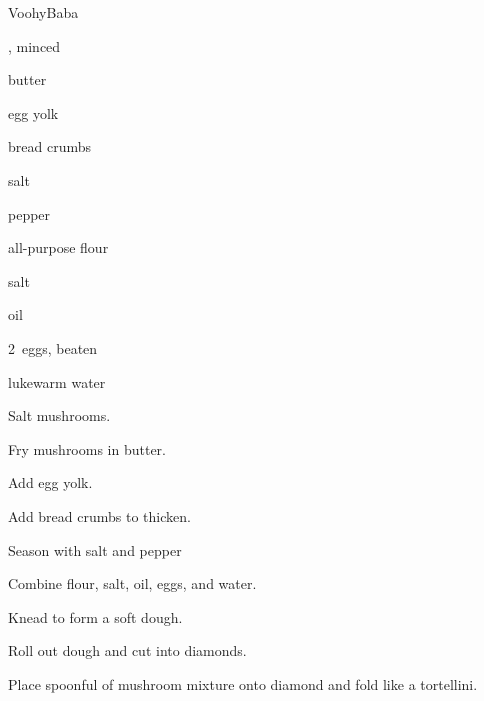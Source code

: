 \begin{recipe}{Voohy}{Baba}{}

\begin{ingredients}
\item {}, minced
\item butter
\item egg yolk
\item bread crumbs
\item salt
\item pepper

\item {} all-purpose flour
\item \tp{1\half} salt
\item {} oil
\item 2~eggs, beaten
\item \C{1\half} lukewarm water
\end{ingredients}

\begin{directions}
\item Salt mushrooms.
\item Fry mushrooms in butter.
\item Add egg yolk.
\item Add bread crumbs to thicken.
\item Season with salt and pepper
\item Combine flour, \tp{1\half} salt, oil, eggs, and water.
\item Knead to form a soft dough.
\item Roll out dough and cut into diamonds.
\item Place spoonful of mushroom mixture onto diamond and fold like a tortellini.
\end{directions}

\end{recipe}
